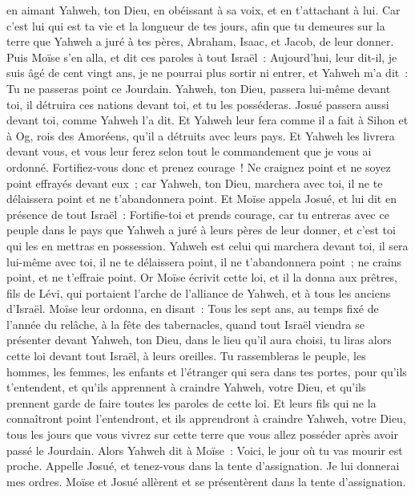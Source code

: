 \begin{multicols}{2}
en aimant Yahweh, ton Dieu, en obéissant à sa voix, et en t'attachant à lui. Car c'est lui qui est ta vie et la longueur de tes jours, afin que tu demeures sur la terre que Yahweh a juré à tes pères, Abraham, Isaac, et Jacob, de leur donner.
\VerseOne{}Puis Moïse s'en alla, et dit ces paroles à tout Israël~:
Aujourd'hui, leur dit-il, je suis âgé de cent vingt ans, je ne pourrai plus sortir ni entrer, et Yahweh m'a dit~: Tu ne passeras point ce Jourdain.
Yahweh, ton Dieu, passera lui-même devant toi, il détruira ces nations devant toi, et tu les posséderas. Josué passera aussi devant toi, comme Yahweh l'a dit.
Et Yahweh leur fera comme il a fait à Sihon et à Og, rois des Amoréens, qu'il a détruits avec leurs pays.
Et Yahweh les livrera devant vous, et vous leur ferez selon tout le commandement que je vous ai ordonné.
Fortifiez-vous donc et prenez courage~! Ne craignez point et ne soyez point effrayés devant eux~; car Yahweh, ton Dieu, marchera avec toi, il ne te délaissera point et ne t'abandonnera point.
Et Moïse appela Josué, et lui dit en présence de tout Israël~: Fortifie-toi et prends courage, car tu entreras avec ce peuple dans le pays que Yahweh a juré à leurs pères de leur donner, et c'est toi qui les en mettras en possession.
Yahweh est celui qui marchera devant toi, il sera lui-même avec toi, il ne te délaissera point, il ne t'abandonnera point~; ne crains point, et ne t'effraie point.
Or Moïse écrivit cette loi, et il la donna aux prêtres, fils de Lévi, qui portaient l'arche de l'alliance de Yahweh, et à tous les anciens d'Israël.
Moïse leur ordonna, en disant~: Tous les sept ans, au temps fixé de l'année du relâche, à la fête des tabernacles,
quand tout Israël viendra se présenter devant Yahweh, ton Dieu, dans le lieu qu'il aura choisi, tu liras alors cette loi devant tout Israël, à leurs oreilles.
Tu rassembleras le peuple, les hommes, les femmes, les enfants et l'étranger qui sera dans tes portes, pour qu'ils t'entendent, et qu'ils apprennent à craindre Yahweh, votre Dieu, et qu'ils prennent garde de faire toutes les paroles de cette loi.
Et leurs fils qui ne la connaîtront point l'entendront, et ils apprendront à craindre Yahweh, votre Dieu, tous les jours que vous vivrez sur cette terre que vous allez posséder après avoir passé le Jourdain.
Alors Yahweh dit à Moïse~: Voici, le jour où tu vas mourir est proche. Appelle Josué, et tenez-vous dans la tente d'assignation. Je lui donnerai mes ordres. Moïse et Josué allèrent et se présentèrent dans la tente d'assignation.

\end{multicols}
